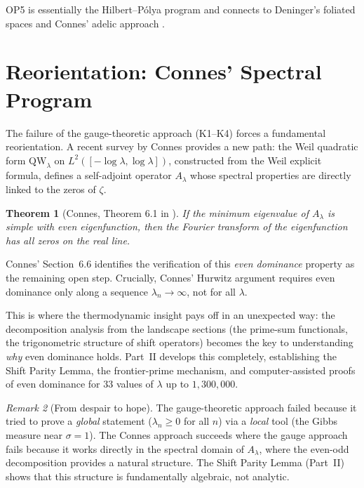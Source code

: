 \documentclass[12pt,a4paper]{article}
\newtheorem{theorem}{Theorem}[section]
\theoremstyle{definition}
\theoremstyle{remark}
\newtheorem{remark}[theorem]{Remark}
\begin{document}
OP5 is essentially the Hilbert--P\'olya program and connects to Deninger's foliated spaces \cite{Deninger2002} and Connes' adelic approach \cite{Connes1999}.


\section{Reorientation: Connes' Spectral Program}
\label{sec:reorientation}

The failure of the gauge-theoretic approach (K1--K4) forces a fundamental reorientation. A recent survey by Connes \cite{Connes2026} provides a new path: the Weil quadratic form $\mathrm{QW}_\lambda$ on $L^2([-\log\lambda, \log\lambda])$, constructed from the Weil explicit formula, defines a self-adjoint operator $A_\lambda$ whose spectral properties are directly linked to the zeros of $\zeta$.

\begin{theorem}[Connes, Theorem 6.1 in \cite{Connes2026}]
If the minimum eigenvalue of $A_\lambda$ is simple with even eigenfunction, then the Fourier transform of the eigenfunction has all zeros on the real line.
\end{theorem}

Connes' Section~6.6 identifies the verification of this \emph{even dominance} property as the remaining open step. Crucially, Connes' Hurwitz argument requires even dominance only along a sequence $\lambda_n \to \infty$, not for all $\lambda$.

This is where the thermodynamic insight pays off in an unexpected way: the decomposition analysis from the landscape sections (the prime-sum functionals, the trigonometric structure of shift operators) becomes the key to understanding \emph{why} even dominance holds. Part~II develops this completely, establishing the Shift Parity Lemma, the frontier-prime mechanism, and computer-assisted proofs of even dominance for $33$ values of $\lambda$ up to $1{,}300{,}000$.

\begin{remark}[From despair to hope]
The gauge-theoretic approach failed because it tried to prove a \emph{global} statement ($\lambda_n \geq 0$ for all $n$) via a \emph{local} tool (the Gibbs measure near $\sigma = 1$). The Connes approach succeeds where the gauge approach fails because it works directly in the spectral domain of $A_\lambda$, where the even-odd decomposition provides a natural structure. The Shift Parity Lemma (Part~II) shows that this structure is fundamentally algebraic, not analytic.
\end{remark}
\end{document}
